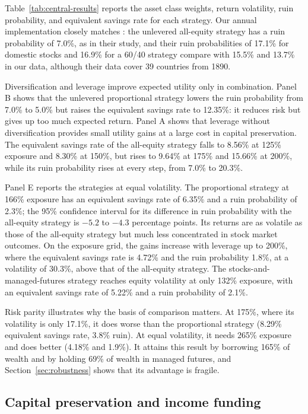 \documentclass[12pt]{article}
\makeatletter
\newif\ifsubmission
\newcommand{\exhibitlist}{}
\newcommand{\exhibit}[1]{\ifsubmission\g@addto@macro\exhibitlist{}\else\fi}
\makeatother
\begin{document}
Table~\ref{tab:central-results} reports the asset class weights, return volatility, ruin probability, and
equivalent savings rate for each strategy. Our annual implementation closely matches
\citet{AnarkulovaCederburgODoherty2025}: the unlevered all-equity strategy has a ruin probability of
7.0\%, as in their study, and their ruin probabilities of 17.1\% for domestic stocks and 16.9\% for a 60/40
strategy compare with 15.5\% and 13.7\% in our data, although their data cover 39 countries from 1890.
\exhibit{figures/erc/central.tex}

Diversification and leverage improve expected utility only in combination. Panel B shows that the
unlevered proportional strategy lowers the ruin probability from 7.0\% to 5.0\% but raises the equivalent
savings rate to 12.35\%: it reduces risk but gives up too much expected return. Panel A shows that leverage
without diversification provides small utility gains at a large cost in capital preservation. The
equivalent savings rate of the all-equity strategy falls to 8.56\% at 125\% exposure and 8.30\% at 150\%,
but rises to 9.64\% at 175\% and 15.66\% at 200\%, while its ruin probability rises at every step, from 7.0\%
to 20.3\%.

Panel E reports the strategies at equal volatility. The proportional strategy at 166\% exposure has an
equivalent savings rate of 6.35\% and a ruin probability of 2.3\%; the 95\% confidence interval for its
difference in ruin probability with the all-equity strategy is $-5.2$ to $-4.3$ percentage points. Its
returns are as volatile as those of the all-equity strategy but much less concentrated in stock market
outcomes. On the exposure grid, the gains increase with leverage up to 200\%, where the equivalent savings
rate is 4.72\% and the ruin probability 1.8\%, at a volatility of 30.3\%, above that of the all-equity
strategy. The stocks-and-managed-futures strategy reaches equity volatility at only 132\% exposure, with an
equivalent savings rate of 5.22\% and a ruin probability of 2.1\%.

Risk parity illustrates why the basis of comparison matters. At 175\%, where its volatility is only
17.1\%, it does worse than the proportional strategy (8.29\% equivalent savings rate, 3.8\% ruin). At
equal volatility, it needs 265\% exposure and does better (4.18\% and 1.9\%). It attains this result by borrowing 165\% of wealth and by
holding 69\% of wealth in managed futures, and Section~\ref{sec:robustness} shows that its advantage is
fragile.

\subsection{Capital preservation and income funding}
\label{sec:common-income}
\end{document}
